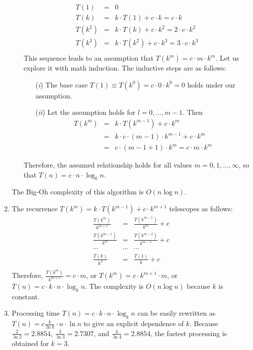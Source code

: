 \documentclass[]{article}
\begin{document}
\begin{enumerate}
\begin{enumerate}
\begin{eqnarray*}
T(1) & = & 0\\
T(k) & = & k \cdot T(1) + c \cdot k = c \cdot k\\
T(k^{2}) & = & k \cdot T(k) + c \cdot k^{2} = 2\cdot c \cdot k^{2}\\
T(k^{3}) & = & k \cdot T(k^{2}) + c \cdot k^{3} = 3\cdot c \cdot k^{3}\\
\end{eqnarray*}
This sequence leads to an assumption that $T(k^m) = c\cdot m \cdot k^{m}$.
Let us explore it with math induction. The inductive steps are as
follows:
\begin{itemize}
\item[({\it i})] The base case
$T(1) \equiv T(k^{0}) = c\cdot 0 \cdot k^0 = 0$ holds under our assumption.\\
\item[({\it ii})] Let the assumption holds for $l=0,\ldots,m-1$. Then
\begin{eqnarray*}
T(k^{m})& = & k\cdot T(k^{m-1}) + c \cdot k^{m}\\
        & = & k \cdot c \cdot (m-1) \cdot k^{m-1} + c \cdot k^{m}\\
        & = & c \cdot (m-1+1) \cdot k^{m} = c \cdot m \cdot k^{m}
\end{eqnarray*}
\end{itemize}
Therefore, the assumed relationship holds for all values 
\(m = 0, 1, \ldots, \infty\), so that 
$T(n) = c \cdot n \cdot \log_{k}n$.
\end{enumerate}
The Big-Oh complexity of this algorithm is $O(n\log n)$.

\item
The recurrence $T(k^{m}) = k \cdot T(k^{m-1}) + c \cdot k^{m + 1}$ 
telescopes as follows:
\[
\begin{array}{lll}
\frac{T(k^{m})}{k^{m+1}} & = & \frac{T(k^{m-1})}{k^{m}} + c\\
\frac{T(k^{m-1})}{k^{m}} & = & \frac{T(k^{m-2})}{k^{m-1}} + c\\
\cdots & \cdots & \cdots\\
\frac{T(k)}{k^{2}} & = & \frac{T(1)}{k} + c\\
\end{array}
\]
Therefore, $\frac{T(k^{m})}{k^{m+1}} = c \cdot m$, or 
$T(k^{m}) = c \cdot k^{m+1} \cdot m $, 
or $T(n) = c \cdot k \cdot n \cdot \log_{k}n$.
The complexity is $O(n\log n)$ because $k$ is constant.

\item
Processing time $T(n) = c \cdot k \cdot n \cdot \log_{k}n$ can
be easily rewritten as $T(n) = c \frac{k}{\ln k} \cdot n \cdot \ln n$
to give an explicit dependence of $k$. Because $\frac{2}{\ln 2} = 2.8854$,
$\frac{3}{\ln 3} = 2.7307$, and $\frac{4}{\ln 4} = 2.8854$, the
fastest processing is obtained for $k=3$.


\end{enumerate}
\end{document}
